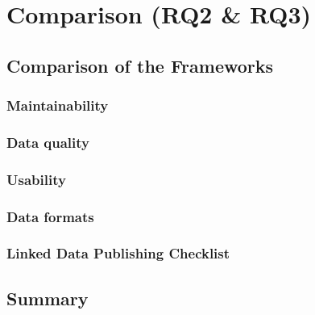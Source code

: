 \chapter{Comparison (RQ2 \& RQ3)}

\section{Comparison of the Frameworks}
\subsection{Maintainability}
\subsection{Data quality}
\subsection{Usability}
\subsection{Data formats}
\subsection{Linked Data Publishing Checklist}

\section{Summary}